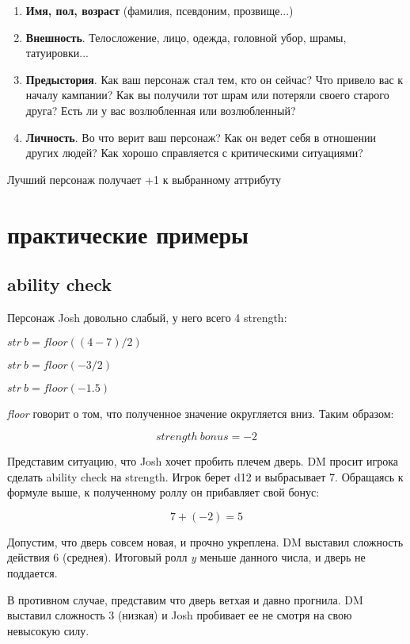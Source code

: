 \documentclass[a4paper,12pt,twocolumn]{book}
\begin{document}
\begin{enumerate}
  \item \textbf{Имя, пол, возраст} (фамилия, псевдоним, прозвище...)
  \item \textbf{Внешность}. Телосложение, лицо, одежда, головной убор, шрамы, татуировки...
  \item \textbf{Предыстория}. Как ваш персонаж стал тем, кто он сейчас? Что привело вас к началу кампании? Как вы получили тот шрам или потеряли своего старого друга? Есть ли у вас возлюбленная или возлюбленный?
  \item \textbf{Личность}. Во что верит ваш персонаж? Как он ведет себя в отношении других людей? Как хорошо справляется с критическими ситуациями?
\end{enumerate}

Лучший персонаж получает +1 к выбранному аттрибуту





\pagebreak
\chapter{практические примеры}

\hypertarget{abilitycheckexample}{\section{ability check}}

Персонаж Josh довольно слабый, у него всего 4 strength:

\*

\(str\ b = floor((4 - 7)/2)\)

\(str\ b = floor(-3/2)\)

\(str\ b = floor(-1.5)\)

\*

\emph{floor} говорит о том, что полученное значение округляется вниз. Таким образом:

\[strength\ bonus = -2\]

Представим ситуацию, что Josh хочет пробить плечем дверь. DM просит игрока сделать ability check на strength. Игрок берет d12 и выбрасывает 7. Обращаясь к формуле выше, к полученному роллу он прибавляет свой бонус:

\[7 + (-2) = 5\]

Допустим, что дверь совсем новая, и прочно укреплена. DM выставил сложность действия 6 (среднея). Итоговый ролл \emph{y} меньше данного числа, и дверь не поддается. 

В противном случае, представим что дверь ветхая и давно прогнила. DM выставил сложность 3 (низкая) и Josh пробивает ее не смотря на свою невысокую силу.
\end{document}

